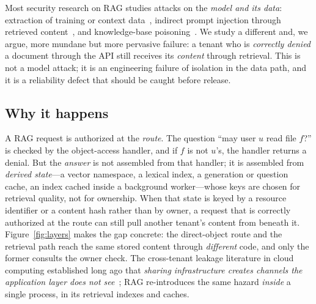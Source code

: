 \IfFileExists{IEEEtran.cls}{\documentclass[conference]{IEEEtran}}{\documentclass[10pt,twocolumn]{article}}
\begin{document}
Most security research on RAG studies attacks on the \emph{model and its data}: extraction of
training or context data~\cite{carlini2021extracting,zeng2024ragprivacy}, indirect prompt
injection through retrieved content~\cite{greshake2023indirect}, and knowledge-base
poisoning~\cite{zou2025poisonedrag}. We study a different and, we argue, more mundane but more
pervasive failure: a tenant who is \emph{correctly denied} a document through the API still receives
its \emph{content} through retrieval. This is not a model attack; it is an engineering failure of
isolation in the data path, and it is a reliability defect that should be caught before release.

\subsection{Why it happens}
A RAG request is authorized at the \emph{route}. The question ``may user $u$ read file $f$?'' is
checked by the object-access handler, and if $f$ is not $u$'s, the handler returns a denial. But
the \emph{answer} is not assembled from that handler; it is assembled from \emph{derived state}---a
vector namespace, a lexical index, a generation or question cache, an index cached inside a
background worker---whose keys are chosen for retrieval quality, not for ownership. When that state
is keyed by a resource identifier or a content hash rather than by owner, a request that is
correctly authorized at the route can still pull another tenant's content from beneath it.
Figure~\ref{fig:layers} makes the gap concrete: the direct-object route and the retrieval path
reach the same stored content through \emph{different} code, and only the former consults the owner
check. The cross-tenant leakage literature in cloud computing established long ago that
\emph{sharing infrastructure creates channels the application layer does not
see}~\cite{ristenpart2009cloud,zhang2012crossvm}; RAG re-introduces the same hazard \emph{inside} a
single process, in its retrieval indexes and caches.
\end{document}
